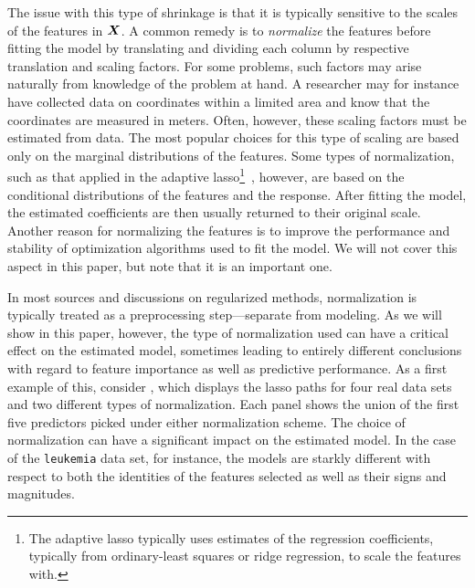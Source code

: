 The issue with this type of shrinkage is that it is typically sensitive to the scales of
the features in \(\boldsymbol X\). A common remedy is to \emph{normalize} the features before
fitting the model by translating and dividing each column by respective translation and
scaling factors. For some problems, such factors may arise naturally from knowledge of the
problem at hand. A researcher may for instance have collected data on coordinates within a
limited area and know that the coordinates are measured in meters. Often, however, these
scaling factors must be estimated from data. The most popular choices for this type of
scaling are based only on the marginal distributions of the features. Some types of
normalization, such as that applied in the adaptive lasso\footnote{The adaptive lasso
  typically uses estimates of the regression coefficients, typically from ordinary-least
  squares or ridge regression, to scale the features with.}~\citep{zou2006}, however, are
based on the conditional distributions of the features and the response. After fitting the
model, the estimated coefficients are then usually returned to their original scale.
Another reason for normalizing the features is to improve the performance and stability of
optimization algorithms used to fit the model. We will not cover this aspect in this paper,
but note that it is an important one.

In most sources and discussions on regularized methods, normalization is typically treated
as a preprocessing step---separate from modeling. As we will show in this paper, however,
the type of normalization used can have a critical effect on the estimated model, sometimes
leading to entirely different conclusions with regard to feature importance as well as
predictive performance. As a first example of this, consider ,
which displays the lasso paths for four real data sets and two different types of
normalization. Each panel shows the union of the first five predictors picked under either
normalization scheme. The choice of normalization can have a significant impact on the
estimated model. In the case of the \texttt{leukemia} data set, for instance, the models
are starkly different with respect to both the identities of the features selected as well
as their signs and magnitudes.

